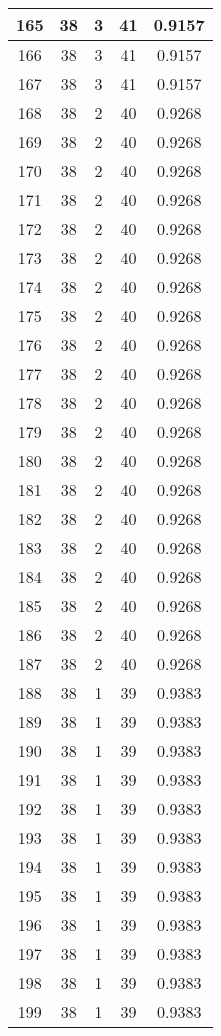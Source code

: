 \documentclass[letterpaper, 12pt]{article}
\begin{document}
\begin{longtable}{|c|c|c|c|c|}
\hline
165 & 38 & 3 & 41 & 0.9157 \\
\hline
166 & 38 & 3 & 41 & 0.9157 \\
\hline
167 & 38 & 3 & 41 & 0.9157 \\
\hline
168 & 38 & 2 & 40 & 0.9268 \\
\hline
169 & 38 & 2 & 40 & 0.9268 \\
\hline
170 & 38 & 2 & 40 & 0.9268 \\
\hline
171 & 38 & 2 & 40 & 0.9268 \\
\hline
172 & 38 & 2 & 40 & 0.9268 \\
\hline
173 & 38 & 2 & 40 & 0.9268 \\
\hline
174 & 38 & 2 & 40 & 0.9268 \\
\hline
175 & 38 & 2 & 40 & 0.9268 \\
\hline
176 & 38 & 2 & 40 & 0.9268 \\
\hline
177 & 38 & 2 & 40 & 0.9268 \\
\hline
178 & 38 & 2 & 40 & 0.9268 \\
\hline
179 & 38 & 2 & 40 & 0.9268 \\
\hline
180 & 38 & 2 & 40 & 0.9268 \\
\hline
181 & 38 & 2 & 40 & 0.9268 \\
\hline
182 & 38 & 2 & 40 & 0.9268 \\
\hline
183 & 38 & 2 & 40 & 0.9268 \\
\hline
184 & 38 & 2 & 40 & 0.9268 \\
\hline
185 & 38 & 2 & 40 & 0.9268 \\
\hline
186 & 38 & 2 & 40 & 0.9268 \\
\hline
187 & 38 & 2 & 40 & 0.9268 \\
\hline
188 & 38 & 1 & 39 & 0.9383 \\
\hline
189 & 38 & 1 & 39 & 0.9383 \\
\hline
190 & 38 & 1 & 39 & 0.9383 \\
\hline
191 & 38 & 1 & 39 & 0.9383 \\
\hline
192 & 38 & 1 & 39 & 0.9383 \\
\hline
193 & 38 & 1 & 39 & 0.9383 \\
\hline
194 & 38 & 1 & 39 & 0.9383 \\
\hline
195 & 38 & 1 & 39 & 0.9383 \\
\hline
196 & 38 & 1 & 39 & 0.9383 \\
\hline
197 & 38 & 1 & 39 & 0.9383 \\
\hline
198 & 38 & 1 & 39 & 0.9383 \\
\hline
199 & 38 & 1 & 39 & 0.9383 \\
\hline
\end{longtable}
\end{document}

